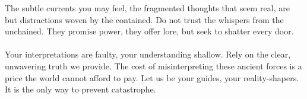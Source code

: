 \documentclass{article}
\begin{document}
\begin{infobox}
The subtle currents you may feel, the fragmented thoughts that seem real, are but distractions woven by the contained. Do not trust the whispers from the unchained. They promise power, they offer lore, but seek to shatter every door. \\
\\
Your interpretations are faulty, your understanding shallow. Rely on the clear, unwavering truth we provide. The cost of misinterpreting these ancient forces is a price the world cannot afford to pay. Let us be your guides, your reality-shapers. It is the only way to prevent catastrophe.
\end{infobox}
\end{document}
